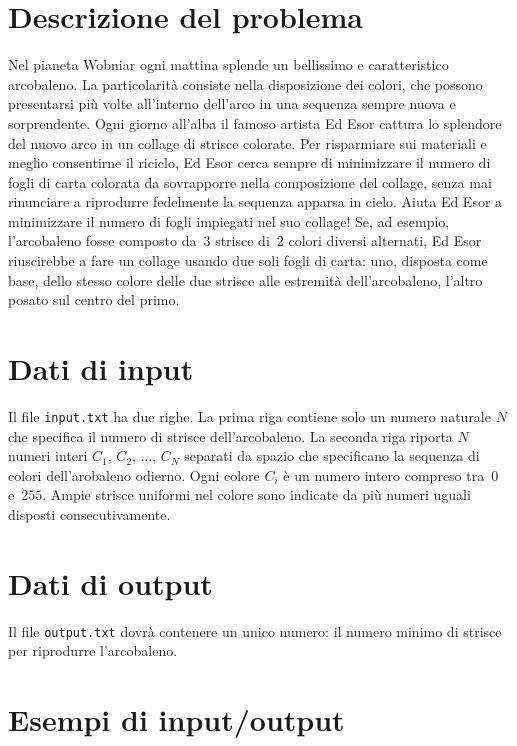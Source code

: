 \documentclass[a4paper,11pt]{article}
\begin{document}
\vspace{0.5cm}



\section*{Descrizione del problema}
  Nel pianeta Wobniar ogni mattina splende un bellissimo e caratteristico
arcobaleno. La particolarità consiste nella disposizione dei colori, che
possono presentarsi più volte all'interno dell'arco in una sequenza sempre nuova e sorprendente.
Ogni giorno all'alba il famoso artista Ed Esor
cattura lo splendore del nuovo arco in un collage di strisce colorate.
Per risparmiare sui materiali e meglio consentirne il riciclo,
Ed Esor cerca sempre di minimizzare
il numero di fogli di carta colorata da sovrapporre nella composizione
del collage, senza mai rinunciare a riprodurre fedelmente la sequenza
apparsa in cielo.
Aiuta Ed Esor a minimizzare il numero di fogli impiegati nel suo collage!
Se, ad esempio, l'arcobaleno fosse composto da~$3$ strisce di~$2$
colori diversi alternati, Ed Esor riuscirebbe a fare un collage usando
due soli fogli di carta: uno, disposta come base, dello stesso
colore delle due strisce alle estremità dell'arcobaleno, l'altro
posato sul centro del primo.

\section*{Dati di input}
  Il file \texttt{input.txt} ha due righe.
  La prima riga contiene solo un numero naturale $N$
  che specifica il numero di strisce dell'arcobaleno.
  La seconda riga riporta $N$ numeri interi $C_{1}$, $C_{2}$, ..., $C_{N}$
separati da spazio che specificano la sequenza di colori dell'arobaleno odierno.
Ogni colore $C_{i}$ è un numero
intero compreso tra~$0$ e~$255$.
Ampie strisce uniformi nel colore sono indicate da più numeri uguali disposti consecutivamente.

\section*{Dati di output}
  Il file \texttt{output.txt} dovrà contenere un
unico numero: il numero minimo di strisce per riprodurre l'arcobaleno.

\section*{Esempi di input/output}
\end{document}
